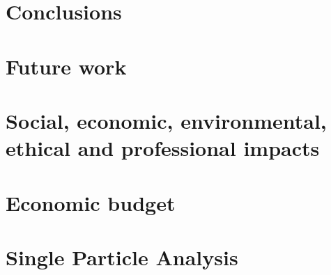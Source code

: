 \documentclass{etsit-report}
\begin{document}
\chapter{Conclusions}
\label{chap:conclusions}


\chapter{Future work}
\label{chap:future}


\printbibliography

\appendix
\chapter{Social, economic, environmental, ethical and professional impacts}


\chapter{Economic budget}
\label{app:budget}

\chapter{Single Particle Analysis}
\label{app:spa}
\begin{refsection}

\newpage
\printbibliography[heading=subbibliography]
\end{refsection}
\end{document}
